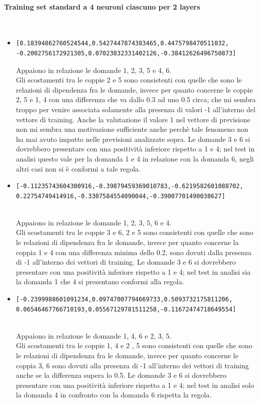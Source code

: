 \paragraph{Training set standard a 4 neuroni ciascuno per 2 layers}\mbox{}
\label{Training set standard su rete a 4 neuroni}
\\
\noindent
\begin{itemize}
\item \begin{verbatim}[0.18394862760524544,0.5427447874383465,0.4475798470511032,
-0.2002756172921305,0.07023832331402126,-0.38412626496750873] \end{verbatim}
Appaiono in relazione le domande 1, 2, 3, 5 e 4, 6.\\
Gli scostamenti tra le coppie 2 e 5 sono consistenti con quelle che sono le relazioni  di dipendenza fra le domande, invece per quanto concerne le coppie 2, 5 e 1, 4 con una differenza che va dallo 0.3 ad uno 0.5 circa; che mi sembra troppo per venire associata solamente alla presenza di valori -1 all'interno del vettore di training. Anche la valutazione il valore 1 nel vettore di previsione non mi sembra una motivazione sufficiente anche perch\`e tale fenomeno non ha mai avuto impatto nelle previsioni analizzate sopra.
Le domande 3 e 6 si dovrebbero presentare con una positivit\`a inferiore rispetto a 1 e 4; nel test in analisi questo vale per la domanda 1 e 4 in relazione con la domanda 6, negli altri casi non si \`e conformi a tale regola.

\item \begin{verbatim}[-0.11235743604300916,-0.39879459369010783,-0.6219582601088702,
0.22754749414916,-0.3307584554090044,-0.39007701490038627] \end{verbatim}\\
Appaiono in relazione le domande 1, 2, 3, 5, 6 e 4.\\
Gli scostamenti tra le coppie 3 e 6, 2 e 5 sono consistenti con quelle che sono le relazioni di dipendenza fra le domande, invece per quanto concerne la coppia 1 e 4 con una differenza minima dello 0.2, sono dovuti dalla presenza di -1  all'interno dei vettori di training.
Le domande 3 e 6 si dovrebbero presentare con una positivit\`a inferiore rispetto a 1 e 4; nel test in analisi sia la domanda 1 che 4 si presentano conformi alla regola.

\item \begin{verbatim}[-0.2399988601091234,0.09747007794669733,0.5093732175811206,
0.06546467766710193,0.05567129781511258,-0.11672474718649554]\end{verbatim}\\
Appaiono in relazione le domande 1, 4, 6 e 2, 3, 5.\\
Gli scostamenti tra le  coppie 1, 4 e 2 , 5 sono consistenti con quelle che sono le relazioni di dipendenza fra le domande, invece per quanto concerne le coppia 3, 6 sono dovuti alla presenza di -1 all'interno dei vettori di training anche se la differenza supera lo 0.5.
Le domande 3 e 6 si dovrebbero presentare con una positivit\`a inferiore rispetto a 1 e 4; nel test in analisi solo la domanda 4 in confronto con la domanda 6 rispetta la regola.


\end{itemize}
